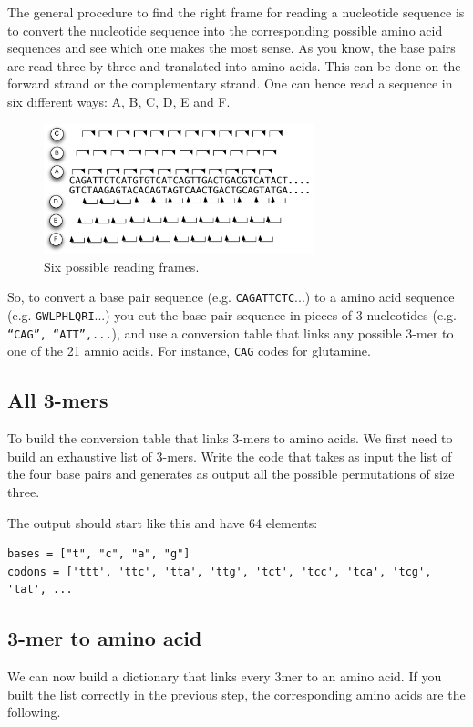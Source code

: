 \documentclass[a4paper,11pt]{article}
\begin{document}
The general procedure to find the right frame for reading a nucleotide sequence is to convert the nucleotide sequence into the corresponding possible amino acid sequences and see which one makes the most sense. As you know, the base pairs are read three by three and translated into amino acids. This can be done on the forward strand or the complementary strand. One can hence read a sequence in six different ways: A, B, C, D, E and F.

\begin{figure}[ht!]
	\centering
	\includegraphics[width=0.7\textwidth]{reading_frame.pdf}
	\caption{Six possible reading frames.}
	\label{fig:gene_distribution_rib}
\end{figure}

So, to convert a base pair sequence (e.g. \texttt{CAGATTCTC}...) to a amino acid sequence (e.g. \texttt{GWLPHLQRI}...) you cut the base pair sequence in pieces of 3 nucleotides (e.g. \texttt{``CAG'', ``ATT'',...}), and use a conversion table that links any possible 3-mer to one of the 21 amnio acids. For instance, \texttt{CAG} codes for glutamine.

\subsection{All 3-mers}
To build the conversion table that links 3-mers to amino acids. We first need to build an exhaustive list of 3-mers. Write the code that takes as input the list of the four base pairs and generates as output all the possible permutations of size three.
	
The output should start like this and have 64 elements:
	
\begin{verbatim}
bases = ["t", "c", "a", "g"]
codons = ['ttt', 'ttc', 'tta', 'ttg', 'tct', 'tcc', 'tca', 'tcg', 'tat', ...
\end{verbatim}

\subsection{3-mer to amino acid}
We can now build a dictionary that links every 3mer to an amino acid. If you built the list correctly in the previous step, the corresponding amino acids are the following.
\end{document}
